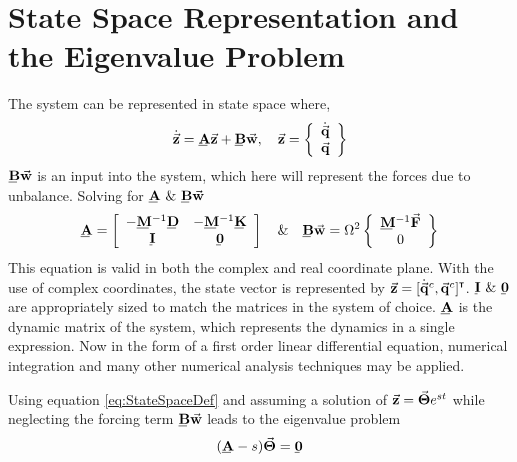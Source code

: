 \section{State Space Representation and the Eigenvalue Problem}
The system can be represented in state space where,
\begin{equation}\label{eq:StateSpaceDef}
\dot{\vec{\mathbf{z}}}=\bunderline{\mathbf{A}}\vec{\mathbf{z}}+\bunderline{\mathbf{B}}\vec{\mathbf{w}},\quad\vec{\mathbf{z}}=\left\{\begin{array}{c}\dot{\vec{\mathbf{q}}}\\\vec{\mathbf{q}}\end{array}\right\}
\end{equation}
$ \bunderline{\mathbf{B}}\vec{\mathbf{w}} $ is an input into the system, which here will represent the forces due to unbalance. Solving for $ \bunderline{\mathbf{A}}\  \&\   \bunderline{\mathbf{B}}\vec{\mathbf{w}}$
\begin{equation}\label{key}
\bunderline{\mathbf{A}}=\left[\begin{array}{cc}
-\bunderline{\mathbf{M}}^{-1}\bunderline{\mathbf{D}}&-\bunderline{\mathbf{M}}^{-1}\bunderline{\mathbf{K}}\\
\bunderline{\mathbf{I}}&\bunderline{\mathbf{0}}
\end{array}\right]\quad\&\quad\bunderline{\mathbf{B}}\vec{\mathbf{w}}=\Omega^2\left\{\begin{array}{c}
\mat{M}^{-1}\vec{\mathbf{F}}\\0\end{array}\right\}
\end{equation}
This equation is valid in both the complex and real coordinate plane. With the use of complex coordinates, the state vector is represented by $ \vec{\mathbf{z}}=[\dot{\vec{\mathbf{q}}}^c,\vec{\mathbf{q}}^c]^{\textbf{{\tiny \textsf{T}}}} $. $ \bunderline{\mathbf{I}}\ \&\ \bunderline{\mathbf{0}} $ are appropriately sized to match the matrices in the system of choice. $ \mat{A} $ is the dynamic matrix of the system, which represents the dynamics in a single expression. Now in the form of a first order linear differential equation, numerical integration and many other numerical analysis techniques may be applied.\par
Using equation \eqref{eq:StateSpaceDef} and assuming a solution of $ \vec{\mathbf{z}}=\vec{\mathbf{\Theta}}e^{st} $ while neglecting the forcing term $ \mat{B}\vect{w} $ leads to the eigenvalue problem
\begin{equation}\label{eq:StateSpaceEigenValueProblem}
(\mat{A}-s)\vect{\Theta}=\mat{0}
\end{equation} 

